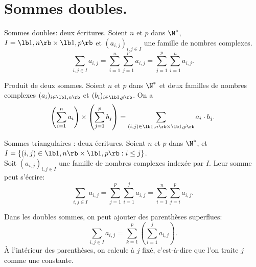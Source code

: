 \documentclass[11pt]{article}
\begin{document}
\vspace*{-1cm}

\section{Sommes doubles.}

\begin{thm}{Sommes doubles: deux écritures.}{}
    Soient $n$ et $p$ dans $\N^*$, $I=\lb1,n\rb\times\lb1,p\rb$ et $(a_{i,j})_{i,j\in I}$ une famille de nombres complexes.
    \begin{equation*}
        \sum_{i,j\in I}a_{i,j}=\sum_{i=1}^n\sum_{j=1}^pa_{i,j}=\sum_{j=1}^p\sum_{i=1}^na_{i,j}.
    \end{equation*}
\end{thm}

\vspace*{-0.9cm}

\begin{prop}{Produit de deux sommes.}{}
    Soient $n$ et $p$ dans $\N^*$ et deux familles de nombres complexes $(a_i)_{i\in\lb1,n\rb}$ et $(b_i)_{i\in\lb1,p\rb}$. On a
    \begin{equation*}
        \left( \sum_{i=1}^na_i \right) \times \left( \sum_{j=1}^pb_j \right) = \sum_{(i,j)\in\lb1,n\rb\times\lb1,p\rb}a_i\cdot b_j.
    \end{equation*}
\end{prop}

\vspace*{-0.9cm}

\begin{prop}{Sommes triangulaires : deux écritures.}{}
    Soient $n$ et $p$ dans $\N^*$, et $I=\{(i,j)\in\lb1,n\rb\times\lb1,p\rb:i\leq j\}$.\\
    Soit $(a_{i,j})_{i,j\in I}$ une famille de nombres complexes indexée par $I$. Leur somme peut s'écrire:
    \begin{equation*}
        \sum_{i,j\in I}a_{i,j}=\sum_{j=1}^p\sum_{i=1}^ja_{i,j}=\sum_{i=1}^n\sum_{j=i}^pa_{i,j}.
    \end{equation*}
\end{prop}

\vspace*{-0.9cm}

\begin{meth}{}{}
    Dans les doubles sommes, on peut ajouter des parenthèses superflues:
    \begin{equation*}
        \sum_{i,j\in I}a_{i,j}=\sum_{k=1}^p\left( \sum_{i=1}^ja_{i,j} \right).
    \end{equation*}
    À l'intérieur des parenthèses, on calcule à $j$ fixé, c'est-à-dire que l'on traite $j$ comme une constante.
\end{meth}
\end{document}
